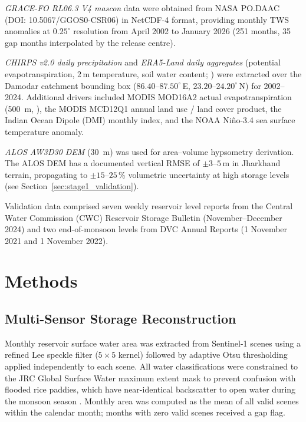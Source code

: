 \documentclass[preprint,12pt,authoryear]{elsarticle}
\begin{document}
\textit{GRACE-FO RL06.3 V4 mascon} data \citep{Tapley2019} were obtained from
NASA PO.DAAC (DOI: 10.5067/GGOS0-CSR06) in NetCDF-4 format, providing
monthly TWS anomalies at $0.25^\circ$ resolution from April 2002 to January
2026 (251 months, 35 gap months interpolated by the release centre).

\textit{CHIRPS v2.0 daily precipitation} \citep{Funk2015} and
\textit{ERA5-Land daily aggregates} (potential evapotranspiration,
2\,m temperature, soil water content; \citealt{MunozSabater2021}) were
extracted over the Damodar catchment bounding box ($86.40$--$87.50^\circ$\,E,
$23.20$--$24.20^\circ$\,N) for 2002--2024. Additional drivers included
MODIS MOD16A2 actual evapotranspiration (\SI{500}{\metre},
\citealt{Running2017}), the MODIS MCD12Q1 annual land use / land cover
product, the Indian Ocean Dipole (DMI) monthly index, and the NOAA
Ni\~{n}o-3.4 sea surface temperature anomaly.

\textit{ALOS AW3D30 DEM} (\SI{30}{\metre}) was used for area--volume
hypsometry derivation. The ALOS DEM has a documented vertical RMSE of
$\pm 3$--$5$\,\si{\metre} in Jharkhand terrain, propagating to $\pm 15$--$25$\,\%
volumetric uncertainty at high storage levels (see
Section~\ref{sec:stage1_validation}).

Validation data comprised seven weekly reservoir level reports from the
Central Water Commission (CWC) Reservoir Storage Bulletin (November--December
2024) and two end-of-monsoon levels from DVC Annual Reports (1 November 2021
and 1 November 2022).

\section{Methods}
\label{sec:methods}

\subsection{Multi-Sensor Storage Reconstruction}
\label{sec:methods_stage1}

Monthly reservoir surface water area was extracted from Sentinel-1 scenes
using a refined Lee speckle filter ($5 \times 5$ kernel) followed by adaptive
Otsu thresholding applied independently to each scene. All water
classifications were constrained to the JRC Global Surface Water maximum
extent mask \citep{Pekel2016} to prevent confusion with flooded rice paddies,
which have near-identical backscatter to open water during the monsoon season
\citep{Twele2016}. Monthly area was computed as the mean of all valid scenes
within the calendar month; months with zero valid scenes received a gap flag.
\end{document}
